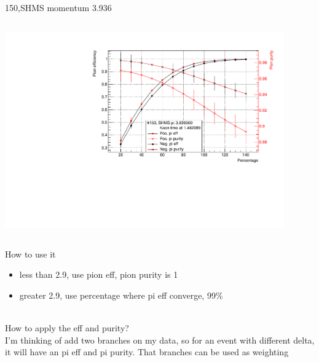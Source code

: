 \documentclass[aspectratio=169,xcolor=dvipsnames]{beamer}
\begin{document}
\begin{frame}{150,SHMS momentum 3.936}
\begin{columns}
\begin{column}[T]{0.3\textwidth}
\includegraphics[width = 0.9\textwidth]{results/pid/SHMS_rf_150_5.pdf}
\end{column}
\end{columns}
\end{frame}
\begin{frame}{How to use it}
\begin{itemize}
    \item less than 2.9, use pion eff, pion purity is 1
    \item greater 2.9, use percentage where pi eff converge, 99\%
\end{itemize}
    \\
    How to apply the eff and purity?
    \\
    I'm thinking of add two branches on my data, so for an event with different delta, it will have an pi eff and pi purity. That branches can be used as weighting
\end{frame}
\end{document}
